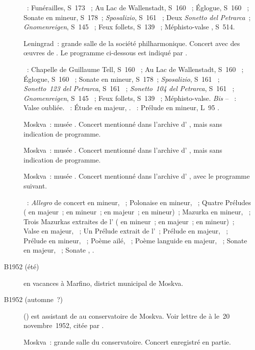 \begin{description}
 \textsc{\Liszt{}}~: Funérailles, S~173 ~; Au Lac de Wallenstadt,
 S~160 ~; Églogue, S~160 ~; Sonate en \kB mineur,
 S~178~; \emph{Sposalizio}, S~161 ~; Deux \emph{Sonetto del
 Petrarca}~; \emph{Gnomenreigen}, S~145 ~; Feux follets, S~139
 ~; Méphisto-valse , S~514.
 \item[\DateWithWeekDay{1952-05-18}]
 Leningrad~: grande salle de la société philharmonique.
 Concert avec des œuvres de \Liszt{}.
 Le programme ci-dessous est indiqué par \citet[p.~66]{Gakkel86}.

 \textsc{\Liszt{}}~: Chapelle de Guillaume Tell, S~160 ~; Au Lac
 de Wallenstadt, S~160 ~; Églogue, S~160 ~; Sonate en
 \kB mineur, S~178~; \emph{Sposalizio}, S~161 ~; \emph{Sonetto~123
 del Petrarca}, S~161 ~; \emph{Sonetto~104 del Petrarca}, S~161
 ~; \emph{Gnomenreigen}, S~145 ~; Feux follets, S~139
 ~; Méphisto-valse.
 \emph{Bis} -- \textsc{\Liszt{}}~: Valse oubliée.
 \textsc{\Chopin{}}~: Étude  en \kF majeur,  .
 \textsc{\Debussy{}}~: Prélude en \kA mineur, L~95 .
 \item[\DateWithWeekDay{1952-06-15}]
 Moskva~: musée \Scriabine{}.
 Concert mentionné dans l'archive d'\AVizel{} \citep[p.~174]{Nekrasova08},
 mais sans indication de programme.
 \item[\DateWithWeekDay{1952-06-18}]
 Moskva~: musée \Scriabine{}.
 Concert mentionné dans l'archive d'\AVizel{} \citep[p.~174]{Nekrasova08},
 mais sans indication de programme.
 \item[\DateWithWeekDay{1952-06-29}]
 Moskva~: musée \Scriabine{}.
 Concert mentionné dans l'archive d'\AVizel{} \citep[p.~174]{Nekrasova08},
 avec le programme suivant.

 \textsc{\Scriabine{}}~: \emph{Allegro} de concert en \kB \Flat mineur,
 ~; Polonaise en \kB \Flat mineur, ~; Quatre Préludes
 (  en \kB majeur~;   en \kB \Flat
 mineur~;   en \kG \Flat majeur~;  
 en \kB mineur)~; Mazurka en \kG \Sharp mineur,  ~; Trois
 Mazurkas extraites de l' ( en \kE mineur~;  en
 \kB majeur~;  en \kF \Sharp mineur)~; Valse en \kA \Flat majeur,
 ~; Un Prélude extrait de l'~; Prélude en \kF \Sharp
 majeur,  ~; Prélude en \kE \Flat mineur, 
 ~; Poème ailé,  ~; Poème languide en \kB
 majeur,  ~; Sonate  en \kF \Sharp majeur,
 ~; Sonate , .
 \item[B1952 (été)]
 \VSofronitsky{} en vacances à Marfino, district municipal de Moskva.
 \item[B1952 (automne~?)]
 \DSerov{} () est assistant de \VSofronitsky{} au
 conservatoire de Moskva.
 Voir lettre de \Sofronitsky{} à \AVizel{} le~20 novembre~1952, citée par
 \citet[p.~174]{Nekrasova08}.
 \item[\DateWithWeekDay{1952-10-10}]
 Moskva~: grande salle du conservatoire.
 Concert enregistré en partie.


\end{description}
